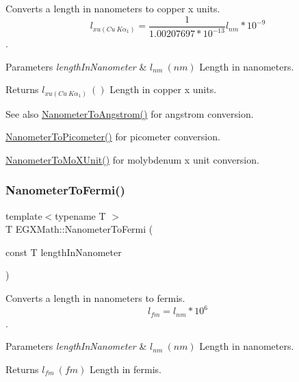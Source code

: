 Converts a length in nanometers to copper x units. \[ l_{xu(Cu\ K\alpha_1)}= \frac{1}{1.00207697*10^{-13}} l_{nm} * 10^{-9}\]. 


\begin{DoxyParams}{Parameters}
{\em length\+In\+Nanometer} & $ l_{nm}\ (nm)$ Length in nanometers. \\
\hline
\end{DoxyParams}
\begin{DoxyReturn}{Returns}
$ l_{xu(Cu\ K\alpha_1)}\ ()$ Length in copper x units. 
\end{DoxyReturn}
\begin{DoxySeeAlso}{See also}
\mbox{\hyperlink{group___e_g_x_math-_conversions-_length_conversions-_s_i-_nanometer-_non-_s_i_ga7e2062d4cc1a422e54da597c4413efb1}{Nanometer\+To\+Angstrom()}} for angstrom conversion. 

\mbox{\hyperlink{group___e_g_x_math-_conversions-_length_conversions-_s_i-_nanometer-_s_i_gaba1e9bf91f6e065f8ba8be8dd039b499}{Nanometer\+To\+Picometer()}} for picometer conversion. 

\mbox{\hyperlink{group___e_g_x_math-_conversions-_length_conversions-_s_i-_nanometer-_non-_s_i_gacc6d7fa95c35687718c816df3c95c7b5}{Nanometer\+To\+Mo\+X\+Unit()}} for molybdenum x unit conversion. 
\end{DoxySeeAlso}
\mbox{\label{group___e_g_x_math-_conversions-_length_conversions-_s_i-_nanometer-_non-_s_i_ga9b708f83b519464f5ebb912bcaaf747d}} 
\subsubsection{\texorpdfstring{Nanometer\+To\+Fermi()}{NanometerToFermi()}}
{\footnotesize\ttfamily template$<$typename T $>$ \\
T E\+G\+X\+Math\+::\+Nanometer\+To\+Fermi (\begin{DoxyParamCaption}\item[{const T}]{length\+In\+Nanometer }\end{DoxyParamCaption})}



Converts a length in nanometers to fermis. \[ l_{fm}=l_{nm} * 10^{6} \]. 


\begin{DoxyParams}{Parameters}
{\em length\+In\+Nanometer} & $ l_{nm}\ (nm)$ Length in nanometers. \\
\hline
\end{DoxyParams}
\begin{DoxyReturn}{Returns}
$ l_{fm}\ (fm)$ Length in fermis. 
\end{DoxyReturn}
\mbox{\label{group___e_g_x_math-_conversions-_length_conversions-_s_i-_nanometer-_non-_s_i_ga278b008cafd5027568e16cbc8af7fb6a}} 
